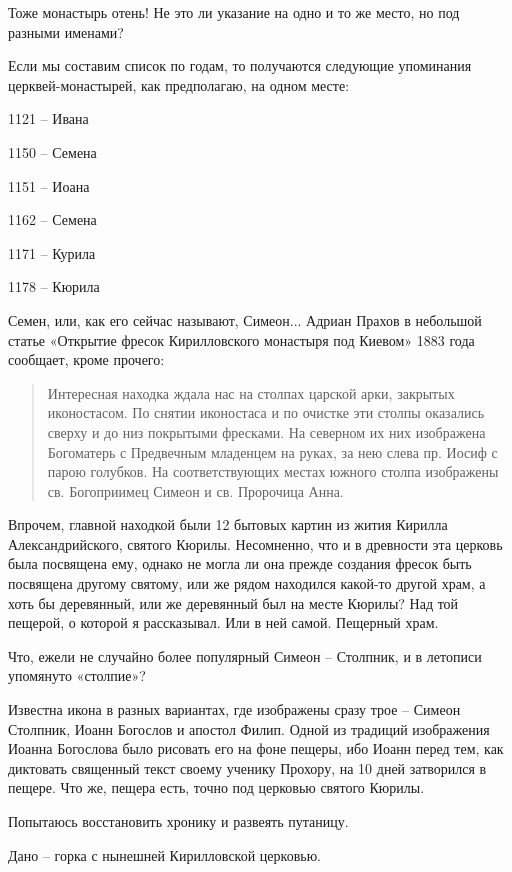 Тоже монастырь отень! Не это ли указание на одно и то же место, но под разными именами?

Если мы составим список по годам, то получаются следующие упоминания церквей-монастырей, как предполагаю, на одном месте:

\medskip

1121 – Ивана

1150 – Семена

1151 – Иоана

1162 – Семена

1171 – Курила

1178 – Кюрила

\medskip

Семен, или, как его сейчас называют, Симеон... Адриан Прахов в небольшой статье «Открытие фресок Кирилловского монастыря под Киевом» 1883 года сообщает, кроме прочего:

\begin{quotation}
Интересная находка ждала нас на столпах царской арки, закрытых иконостасом. По снятии иконостаса и по очистке эти столпы оказались сверху и до низ покрытыми фресками. На северном их них изображена Богоматерь с Предвечным младенцем на руках, за нею слева пр. Иосиф с парою голубков. На соответствующих местах южного столпа изображены св. Богоприимец Симеон и св. Пророчица Анна.
\end{quotation}

Впрочем, главной находкой были 12 бытовых картин из жития Кирилла Александрийского, святого Кюрилы. Несомненно, что и в древности эта церковь была посвящена ему, однако не могла ли она прежде создания фресок быть посвящена другому святому, или же рядом находился какой-то другой храм, а хоть бы деревянный, или же деревянный был на месте Кюрилы? Над той пещерой, о которой я рассказывал. Или в ней самой. Пещерный храм.

Что, ежели не случайно более популярный Симеон – Столпник, и в летописи упомянуто «столпие»?

Известна икона в разных вариантах, где изображены сразу трое – Симеон Столпник, Иоанн Богослов и апостол Филип. Одной из традиций изображения Иоанна Богослова было рисовать его на фоне пещеры, ибо Иоанн перед тем, как диктовать священный текст своему ученику Прохору, на 10 дней затворился в пещере. Что же, пещера есть, точно под церковью святого Кюрилы.

Попытаюсь восстановить хронику и развеять путаницу.

Дано – горка с нынешней Кирилловской церковью.

